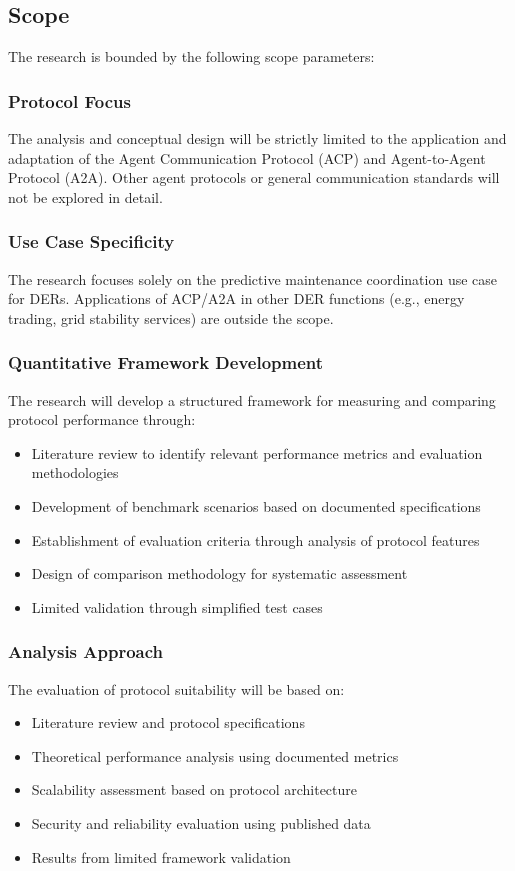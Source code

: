 \subsection{Scope}

The research is bounded by the following scope parameters:

\subsubsection{Protocol Focus}
The analysis and conceptual design will be strictly limited to the application and adaptation of the Agent Communication Protocol (ACP) and Agent-to-Agent Protocol (A2A). Other agent protocols or general communication standards will not be explored in detail.

\subsubsection{Use Case Specificity}
The research focuses solely on the predictive maintenance coordination use case for DERs. Applications of ACP/A2A in other DER functions (e.g., energy trading, grid stability services) are outside the scope.

\subsubsection{Quantitative Framework Development}
The research will develop a structured framework for measuring and comparing protocol performance through:
\begin{itemize}
    \item Literature review to identify relevant performance metrics and evaluation methodologies
    \item Development of benchmark scenarios based on documented specifications
    \item Establishment of evaluation criteria through analysis of protocol features
    \item Design of comparison methodology for systematic assessment
    \item Limited validation through simplified test cases
\end{itemize}

\subsubsection{Analysis Approach}
The evaluation of protocol suitability will be based on:
\begin{itemize}
    \item Literature review and protocol specifications
    \item Theoretical performance analysis using documented metrics
    \item Scalability assessment based on protocol architecture
    \item Security and reliability evaluation using published data
    \item Results from limited framework validation
\end{itemize}

